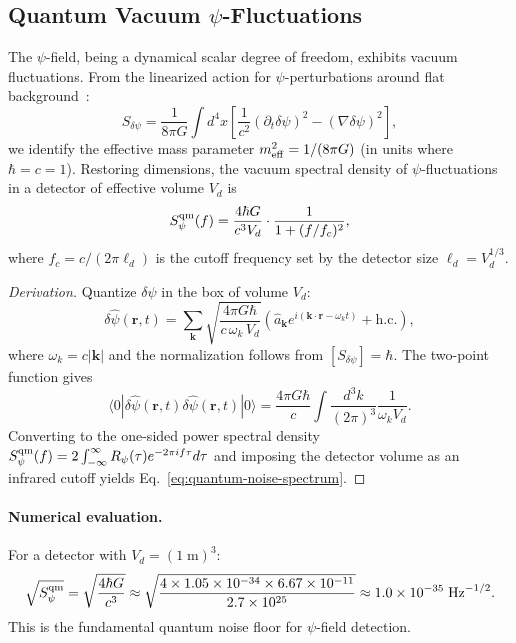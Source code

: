 \documentclass[twocolumn,superscriptaddress,prd,nofootinbib]{revtex4-2}
\begin{document}
\subsection{Quantum Vacuum $\psi$-Fluctuations}

The $\psi$-field, being a dynamical scalar degree of freedom, exhibits
vacuum fluctuations. From the linearized action for $\psi$-perturbations
around flat background~\cite{Alcock2025DFD}:
\begin{equation}
S_{\delta\psi} = \frac{1}{8\pi G}\int d^4x\left[
\frac{1}{c^2}(\partial_t \delta\psi)^2 - (\nabla\delta\psi)^2
\right],
\label{eq:linearized-action}
\end{equation}
we identify the effective mass parameter
$m_{\rm eff}^2 = 1/(8\pi G)$ (in units where $\hbar = c = 1$).
Restoring dimensions, the vacuum spectral density of $\psi$-fluctuations
in a detector of effective volume $V_d$ is
\begin{equation}
S_\psi^{\rm qm}(f) = \frac{4\hbar G}{c^3 V_d}
\cdot \frac{1}{1 + (f/f_c)^2},
\label{eq:quantum-noise-spectrum}
\end{equation}
where $f_c = c/(2\pi \ell_d)$ is the cutoff frequency set by the
detector size $\ell_d = V_d^{1/3}$.

\begin{proof}[Derivation]
Quantize $\delta\psi$ in the box of volume $V_d$:
\begin{equation}
\delta\hat\psi(\mathbf{r},t) = \sum_\mathbf{k}
\sqrt{\frac{4\pi G \hbar}{c\,\omega_k\,V_d}}
\left(\hat{a}_\mathbf{k} e^{i(\mathbf{k}\cdot\mathbf{r} - \omega_k t)}
+ \text{h.c.}\right),
\end{equation}
where $\omega_k = c|\mathbf{k}|$ and the normalization follows from
$[S_{\delta\psi}] = \hbar$. The two-point function gives
\begin{equation}
\langle 0|\delta\hat\psi(\mathbf{r},t)\delta\hat\psi(\mathbf{r},t)|0\rangle
= \frac{4\pi G\hbar}{c}\int \frac{d^3k}{(2\pi)^3}\frac{1}{\omega_k V_d}.
\end{equation}
Converting to the one-sided power spectral density
$S_\psi^{\rm qm}(f) = 2\int_{-\infty}^\infty R_\psi(\tau)e^{-2\pi i f\tau}d\tau$
and imposing the detector volume as an infrared cutoff yields
Eq.~\eqref{eq:quantum-noise-spectrum}.
\end{proof}

\paragraph{Numerical evaluation.}
For a detector with $V_d = (1\;\text{m})^3$:
\begin{equation}
\sqrt{S_\psi^{\rm qm}} = \sqrt{\frac{4\hbar G}{c^3}}
\approx \sqrt{\frac{4 \times 1.05\times 10^{-34}\times 6.67\times 10^{-11}}
{2.7\times 10^{25}}}
\approx 1.0\times 10^{-35}\;\text{Hz}^{-1/2}.
\end{equation}
This is the fundamental quantum noise floor for $\psi$-field detection.
\end{document}
